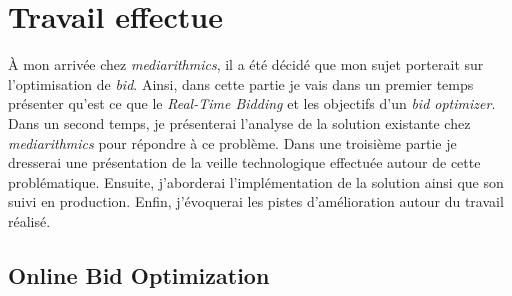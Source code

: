 \section{Travail effectue}
    À mon arrivée chez \emph{mediarithmics}, il a été décidé que mon sujet porterait sur l'optimisation de \emph{bid}. 
    Ainsi, dans cette partie je vais dans un premier temps présenter qu'est ce que le \emph{Real-Time Bidding} et les 
    objectifs d'un \emph{bid optimizer}. Dans un second temps, je présenterai l'analyse de la solution existante chez 
    \emph{mediarithmics} pour répondre à ce problème. Dans une troisième partie je dresserai une présentation de la 
    veille technologique effectuée autour de cette problématique. Ensuite, j'aborderai l'implémentation de la solution 
    ainsi que son suivi en production. Enfin, j'évoquerai les pistes d'amélioration autour du travail réalisé.
    \subsection{Online Bid Optimization} 
